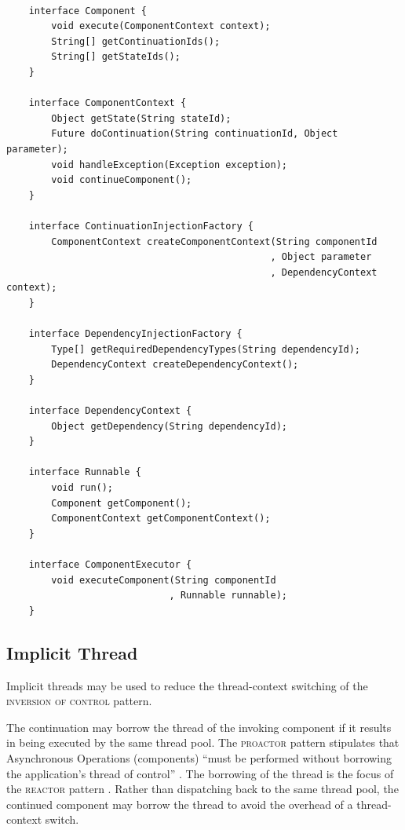 \documentclass[prodmode]{style/acmlarge}
\begin{document}
\begin{lstlisting}[float,label=lst:IocInjectionInterfaces]

    interface Component {
        void execute(ComponentContext context);
        String[] getContinuationIds();
        String[] getStateIds();
    }

    interface ComponentContext {
        Object getState(String stateId);
        Future doContinuation(String continuationId, Object parameter);
        void handleException(Exception exception);
        void continueComponent();
    }
    
    interface ContinuationInjectionFactory {
        ComponentContext createComponentContext(String componentId
                                               , Object parameter
                                               , DependencyContext context);
    }
    
    interface DependencyInjectionFactory {
        Type[] getRequiredDependencyTypes(String dependencyId);
        DependencyContext createDependencyContext();
    }
    
    interface DependencyContext {
        Object getDependency(String dependencyId);
    }
    
    interface Runnable {
        void run();
        Component getComponent();
        ComponentContext getComponentContext();
    }

    interface ComponentExecutor {
        void executeComponent(String componentId 
                             , Runnable runnable);
    }
\end{lstlisting}


\subsection{Implicit Thread}

Implicit threads may be used to reduce the thread-context switching of the
\textsc{inversion of control} pattern.

The continuation may borrow the thread of the invoking component if it results
in being executed by the same thread pool.  The \textsc{proactor} pattern
stipulates that Asynchronous Operations (components) ``must be performed without
borrowing the application's thread of control'' \cite[p. 8]{proactor}.  The
borrowing of the thread is the focus of the \textsc{reactor} pattern
\cite{reactor}.  Rather than dispatching back to the same thread pool, the
continued component may borrow the thread to avoid the overhead of a
thread-context switch.
\end{document}
